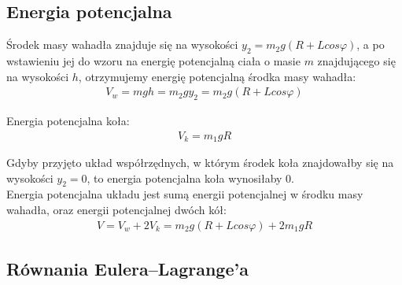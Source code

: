 \subsection{Energia potencjalna}

Środek masy wahadła znajduje się na wysokości $y_2 = m_2g(R + Lcos\varphi)$, a po wstawieniu jej do wzoru na energię potencjalną ciała o masie $m$ znajdującego się na wysokości $h$, otrzymujemy energię potencjalną środka masy wahadła:
$$
    \begin{array}{ll}
    V_w = mgh = m_2gy_2 = m_2g(R + Lcos\varphi)
    \end{array}
$$

Energia potencjalna koła:
$$
    \begin{array}{ll}
    V_k = m_1gR
    \end{array}
$$

Gdyby przyjęto układ współrzędnych, w którym środek koła znajdowałby się na wysokości $y_2 = 0$, to energia potencjalna koła wynosiłaby 0. \\

Energia potencjalna układu jest sumą energii potencjalnej w środku masy wahadła, oraz energii potencjalnej dwóch kół:
\begin{equation}
    \begin{array}{ll}
    V = V_w + 2V_k = m_2g(R + Lcos\varphi) + 2m_1gR
    \end{array}
\end{equation}

\subsection{Równania Eulera--Lagrange'a}

